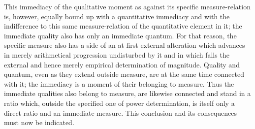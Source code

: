 This immediacy of the qualitative moment as against
its specific measure-relation is, however,
equally bound up with a quantitative immediacy
and with the indifference to this same measure-relation
of the quantitative element in it;
the immediate quality also has only an immediate quantum.
For that reason, the specific measure also has
a side of an at first external alteration
which advances in merely arithmetical progression undisturbed by it
and in which falls the external and hence merely empirical
determination of magnitude.
Quality and quantum, even as they extend outside measure,
are at the same time connected with it;
the immediacy is a moment of their belonging to measure.
Thus the immediate qualities also belong to measure,
are likewise connected and stand in a ratio
which, outside the specified one of power determination,
is itself only a direct ratio and an immediate measure.
This conclusion and its consequences must now be indicated.

